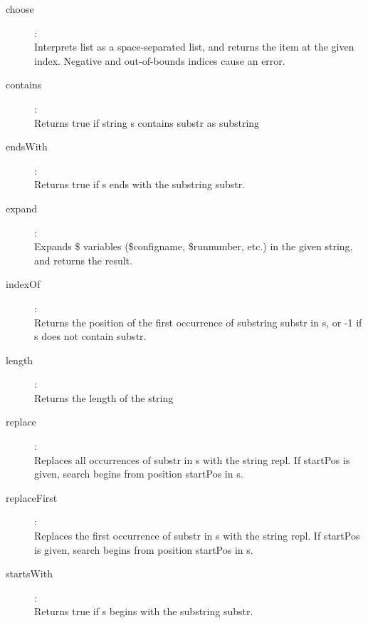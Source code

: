 \begin{description}
\item[choose]:  \\
    Interprets list as a space-separated list, and returns the item at the
    given index. Negative and out-of-bounds indices cause an error.

\item[contains]:  \\
    Returns true if string s contains substr as substring

\item[endsWith]:  \\
    Returns true if s ends with the substring substr.

\item[expand]:  \\
    Expands \${} variables (\${configname}, \${runnumber}, etc.) in the given
    string, and returns the result.

\item[indexOf]:  \\
    Returns the position of the first occurrence of substring substr in s, or
    -1 if s does not contain substr.

\item[length]:  \\
    Returns the length of the string

\item[replace]:  \\
    Replaces all occurrences of substr in s with the string repl. If startPos
    is given, search begins from position startPos in s.

\item[replaceFirst]:  \\
    Replaces the first occurrence of substr in s with the string repl. If
    startPos is given, search begins from position startPos in s.

\item[startsWith]:  \\
    Returns true if s begins with the substring substr.


\end{description}
